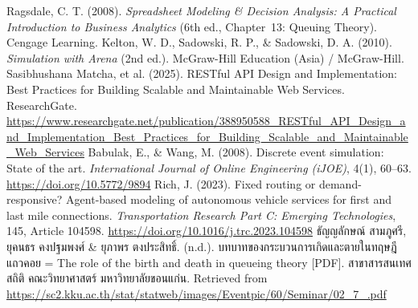 

\sloppy
\begin{thebibliography}{99}
     Ragsdale, C. T. (2008). 
        \textit{Spreadsheet Modeling \& Decision Analysis: A Practical Introduction to Business Analytics} 
        (6th ed., Chapter~13: Queuing Theory). Cengage Learning.
     Kelton, W. D., Sadowski, R. P., \& Sadowski, D. A. (2010). 
        \textit{Simulation with Arena} (2nd ed.). McGraw-Hill Education (Asia) / McGraw-Hill.
     Sasibhushana Matcha, et al. (2025). 
        RESTful API Design and Implementation: Best Practices for Building Scalable and Maintainable Web Services. 
        ResearchGate. \url{https://www.researchgate.net/publication/388950588_RESTful_API_Design_and_Implementation_Best_Practices_for_Building_Scalable_and_Maintainable_Web_Services}
     Babulak, E., \& Wang, M. (2008). Discrete event simulation: State of the art. \textit{International Journal of Online Engineering (iJOE)}, 4(1), 60–63. \url{https://doi.org/10.5772/9894}
     Rich, J. (2023). Fixed routing or demand-responsive? Agent-based modeling of autonomous vehicle services for first and last mile connections. \textit{Transportation Research Part C: Emerging Technologies}, 145, Article 104598. \url{https://doi.org/10.1016/j.trc.2023.104598}
     ธัญญลักษณ์ สามภูศรี, ยุคนธร คงปฐมพงศ์ \& ยุภาพร ตงประสิทธิ์. (n.d.). บทบาทของกระบวนการเกิดและตายในทฤษฎีแถวคอย = The role of the birth and death in queueing theory [PDF]. สาขาสารสนเทศสถิติ คณะวิทยาศาสตร์ มหาวิทยาลัยขอนแก่น. Retrieved from \url{https://sc2.kku.ac.th/stat/statweb/images/Eventpic/60/Seminar/02_7_.pdf}
\end{thebibliography}
